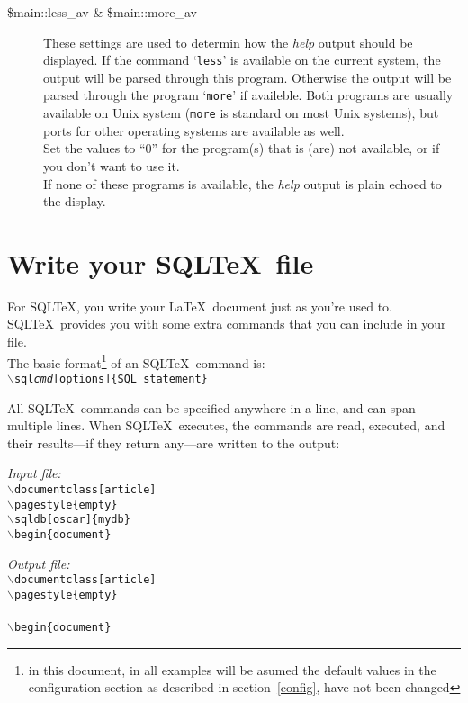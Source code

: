 \documentclass{article}
\newcommand{\bs}{\begin{math}\backslash\end{math}}
\newcommand{\vs}{\vspace{3mm}}
\begin{document}
\begin{description}
\item[\$main::less\_av \& \$main::more\_av] These settings are used to determin how the \textsl{help} output should be displayed. If the
command `\texttt{less}' is available on the current system, the output will be
parsed through this program. Otherwise the output will be parsed through the
program `\texttt{more}' if availeble. Both programs are usually available on Unix
system (\texttt{more} is standard on most Unix systems), but ports for other
operating systems are available as well.\\
Set the values to ``0'' for the program(s) that is (are) not available, or if
you don't want to use it.\\
If none of these programs is available, the \textsl{help} output is plain echoed
to the display.

\end{description}

\section{Write your SQL\TeX\ file}

For SQL\TeX, you write your \LaTeX\ document just as you're used to. SQL\TeX\ provides you with
some extra commands that you can include in your file.\\
The basic format\footnote{in this document, in all examples will be asumed the default values in the
configuration section as described in section~\ref{config}, have not been changed} of an SQL\TeX\ command is: \\
\texttt{\bs sql\emph{cmd}[options]\{SQL statement\}}

\vs

All SQL\TeX\ commands can be specified anywhere in a line, and can span multiple lines.
When SQL\TeX\ executes, the commands are read, executed, and their results---if they return
any---are written to the output:

\vs

\begin{minipage}[t]{0.5\textwidth}\textsl{Input file:}\\\texttt{\footnotesize{\bs documentclass[article] \\
\bs pagestyle\{empty\} \\
\bs sqldb[oscar]\{mydb\} \\
\bs begin\{document\} \\
}}\end{minipage}\hfill\begin{minipage}[t]{0.5\textwidth}\textsl{Output file:}\\\texttt{\footnotesize{\bs documentclass[article] \\
\bs pagestyle\{empty\} \\
 \\
\bs begin\{document\} \\
}}\end{minipage}
\end{document}
